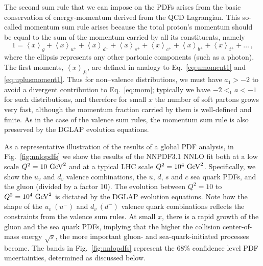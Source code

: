 The second sum rule that we can impose on the PDFs arises
from the basic conservation of energy-momentum derived from
the QCD Lagrangian.
%
This so-called momentum sum rule arises
because the total
proton's momentum should be equal to the sum of the momentum
carried by all its constituents, namely
\begin{equation}\label{eq:mom}
1 = \left\langle x\right\rangle _{g}+\left\langle x\right\rangle _{u^{+}}+\left\langle x\right\rangle _{d^{+}}+\left\langle x\right\rangle _{s^{+}}+\left\langle x\right\rangle _{c^{+}}+\left\langle x\right\rangle _{b^{+}}+\left\langle x\right\rangle _{t^{+}}+\ldots\,,
\end{equation}
%
where the ellipsis represents any other partonic components (such
as a photon). The first moments, $\left\langle x\right\rangle _{f_i}$, are defined in analogy to Eq.~\eqref{eq:umoment1} and \eqref{eq:uplusmoment1}. Thus for non--valence distributions, we must have $a_1>-2$ to avoid a divergent contribution to
Eq.~\eqref{eq:mom}; typically we have $-2<_1a<-1$ for such distributions, and therefore for small $x$ the number of soft partons
grows very fast, although the momentum fraction carried by them is well-defined
and finite.
%
As in the case of the valence sum rules, the momentum
sum rule is also preserved by the DGLAP evolution equations.

As a representative illustration of the results of a global
PDF analysis, in Fig.~\ref{fig:nnlopdfs} we show
the results of the NNPDF3.1 NNLO fit both at a low scale
    $Q^2=10~{\rm GeV}^2$  and at a typical LHC scale
    $Q^2=10^4~{\rm GeV}^2$.
    Specifically, we show the  $u_v$ and $d_v$ valence combinations, the $\bar{u}$,
    $\bar{d}$, $s$ and $c$ sea quark PDFs, and the gluon (divided by a factor 10).
    The evolution between $Q^2=10$ to $Q^2=10^4~{\rm GeV}^2$ is dictated
    by the DGLAP evolution equations.
    Note how the shape of the $u_v~(u^{-})$ and $d_v~(d^{-})$ valence quark combinations
    reflects the constraints from the valence sum rules.
    At small $x$, there is a rapid growth of the gluon and the sea quark PDFs, implying
    that the higher the collision center-of-mass energy $\sqrt{s}$, the more
    important gluon- and sea-quark-initiated processes become.
    The bands in Fig.~\ref{fig:nnlopdfs} represent the 68\% confidence level
    PDF uncertainties, determined as discussed below.

